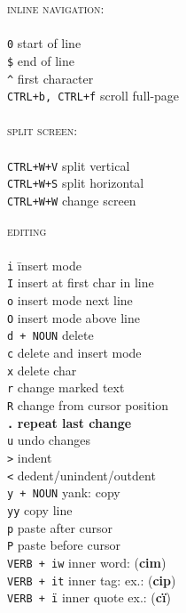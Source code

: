 \documentclass[a4paper,10pt]{scrartcl}
\begin{document}
\begin{multicols}{2}
\begin{tabbing}
\large{\textsc{inline navigation:}}\\\\
\texttt{0}					\> start of line\\
\texttt{\$}					\> end of line \\
\texttt{\^}					\> first character\\
\texttt{CTRL+b, CTRL+f}		\> scroll full-page\\\\

\large{\textsc{split screen:}}\\\\
\texttt{CTRL+W+V}	\> split vertical\\
\texttt{CTRL+W+S}	\> split horizontal\\
\texttt{CTRL+W+W}	\> change screen\\
\end{tabbing}

\begin{tabbing}
\large{\textsc{editing}}\\\\
\texttt{i}				\hspace{2cm}\= insert mode\\
\texttt{I}				\> insert at first char in line\\
\texttt{o}				\> insert mode next line\\
\texttt{O}				\> insert mode above line\\
\texttt{d + NOUN}		\> delete\\
\texttt{c}				\> delete and insert mode \\
\texttt{x}				\> delete char\\
\texttt{r}				\> change marked text\\
\texttt{R}				\> change from cursor position\\
\texttt{\textbf{.}}		\> \textbf{repeat last change}\\
\texttt{u}				\> undo changes\\
\texttt{>}				\> indent\\
\texttt{<}				\> dedent/unindent/outdent\\
\texttt{y + NOUN}		\> yank: copy\\
\texttt{yy}				\> copy line\\
\texttt{p}				\> paste after cursor\\
\texttt{P}				\> paste before cursor\\
\texttt{VERB + iw}		\> inner word: (\textbf{cim})\\
\texttt{VERB + it}		\> inner tag: ex.: (\textbf{cip})\\
\texttt{VERB + i\"}		\> inner quote ex.: (\textbf{ci\"})\\



\end{tabbing}


\end{multicols}
\end{document}
